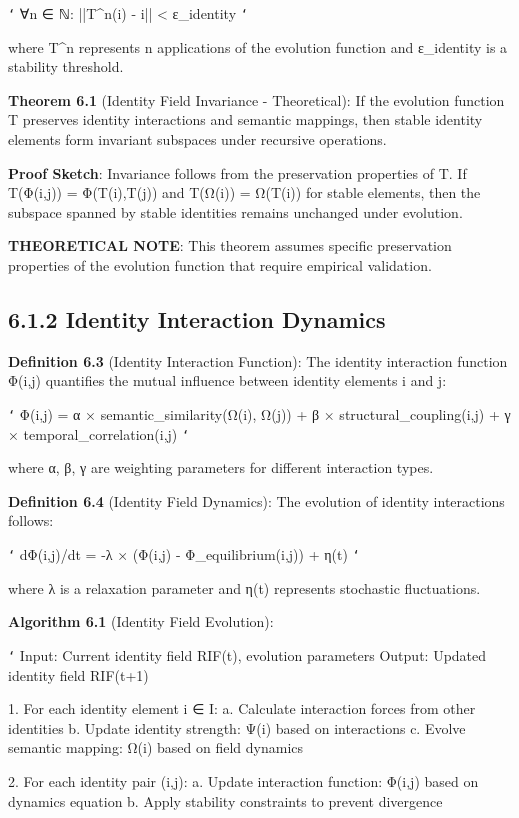 \texttt{`}
∀n ∈ ℕ: ||T^n(i) - i|| < ε_identity
\texttt{`}

where T^n represents n applications of the evolution function and ε_identity is a stability threshold.

\textbf{Theorem 6.1} (Identity Field Invariance - Theoretical): If the evolution function T preserves identity interactions and semantic mappings, then stable identity elements form invariant subspaces under recursive operations.

\textbf{Proof Sketch}: Invariance follows from the preservation properties of T. If T(Φ(i,j)) = Φ(T(i),T(j)) and T(Ω(i)) = Ω(T(i)) for stable elements, then the subspace spanned by stable identities remains unchanged under evolution.

\textbf{THEORETICAL NOTE}: This theorem assumes specific preservation properties of the evolution function that require empirical validation.

\subsection{6.1.2 Identity Interaction Dynamics}

\textbf{Definition 6.3} (Identity Interaction Function): The identity interaction function Φ(i,j) quantifies the mutual influence between identity elements i and j:

\texttt{`}
Φ(i,j) = α × semantic_similarity(Ω(i), Ω(j)) + β × structural_coupling(i,j) + γ × temporal_correlation(i,j)
\texttt{`}

where α, β, γ are weighting parameters for different interaction types.

\textbf{Definition 6.4} (Identity Field Dynamics): The evolution of identity interactions follows:

\texttt{`}
dΦ(i,j)/dt = -λ × (Φ(i,j) - Φ_equilibrium(i,j)) + η(t)
\texttt{`}

where λ is a relaxation parameter and η(t) represents stochastic fluctuations.

\textbf{Algorithm 6.1} (Identity Field Evolution):

\texttt{`}
Input: Current identity field RIF(t), evolution parameters
Output: Updated identity field RIF(t+1)

1. For each identity element i ∈ I:
   a. Calculate interaction forces from other identities
   b. Update identity strength: Ψ(i) based on interactions
   c. Evolve semantic mapping: Ω(i) based on field dynamics
   
2. For each identity pair (i,j):
   a. Update interaction function: Φ(i,j) based on dynamics equation
   b. Apply stability constraints to prevent divergence
   
